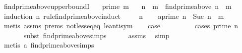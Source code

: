 \begin{isabellebody}
\endisatagproof
{\isafoldproof}%
%
\isadelimproof
\isanewline
%
\endisadelimproof
\isanewline
{}\isamarkupfalse%
\ find{\isacharunderscore}{\kern0pt}prime{\isacharunderscore}{\kern0pt}above{\isacharunderscore}{\kern0pt}upper{\isacharunderscore}{\kern0pt}boundI{\isacharcolon}{\kern0pt}\isanewline
\ \ \ {\isachardoublequoteopen}prime\ m{\isachardoublequoteclose}\isanewline
\ \ \ {\isachardoublequoteopen}n\ {\isasymle}\ m\ {\isasymLongrightarrow}\ find{\isacharunderscore}{\kern0pt}prime{\isacharunderscore}{\kern0pt}above\ n\ {\isasymle}\ m{\isachardoublequoteclose}\isanewline
%
\isadelimproof
%
\endisadelimproof
%
\isatagproof
{}\isamarkupfalse%
\ {\isacharparenleft}{\kern0pt}induction\ n\ rule{\isacharcolon}{\kern0pt}find{\isacharunderscore}{\kern0pt}prime{\isacharunderscore}{\kern0pt}above{\isachardot}{\kern0pt}induct{\isacharparenright}{\kern0pt}\isanewline
\ \ \isamarkupfalse%
\ {\isacharparenleft}{\kern0pt}{}\ n{\isacharparenright}{\kern0pt}\isanewline
\ \ \isamarkupfalse%
\ a{\isacharcolon}{\kern0pt}{\isachardoublequoteopen}{\isasymnot}prime\ n\ {\isasymLongrightarrow}\ Suc\ n\ {\isasymle}\ m{\isachardoublequoteclose}\isanewline
\ \ \ \ \isamarkupfalse%
\ {\isacharparenleft}{\kern0pt}metis\ assms\ {\isachardoublequoteopen}{}{\isachardot}{\kern0pt}prems{\isachardoublequoteclose}\ not{\isacharunderscore}{\kern0pt}less{\isacharunderscore}{\kern0pt}eq{\isacharunderscore}{\kern0pt}eq\ le{\isacharunderscore}{\kern0pt}antisym{\isacharparenright}{\kern0pt}\isanewline
\ \ \isamarkupfalse%
\ {\isacharquery}{\kern0pt}case\ \isamarkupfalse%
\ {}\ \isanewline
\ \ \ \ \isamarkupfalse%
\ {\isacharparenleft}{\kern0pt}cases\ {\isachardoublequoteopen}prime\ n{\isachardoublequoteclose}{\isacharparenright}{\kern0pt}\isanewline
\ \ \ \ \ \isamarkupfalse%
\ {\isacharparenleft}{\kern0pt}subst\ find{\isacharunderscore}{\kern0pt}prime{\isacharunderscore}{\kern0pt}above{\isachardot}{\kern0pt}simps{\isacharparenright}{\kern0pt}\isanewline
\ \ \ \ \isamarkupfalse%
\ assms{\isacharparenleft}{\kern0pt}{}{\isacharparenright}{\kern0pt}\ \isamarkupfalse%
\ simp\isanewline
\ \ \ \ \isamarkupfalse%
\ {\isacharparenleft}{\kern0pt}metis\ a\ find{\isacharunderscore}{\kern0pt}prime{\isacharunderscore}{\kern0pt}above{\isachardot}{\kern0pt}simps{\isacharparenright}{\kern0pt}\isanewline
{}\isamarkupfalse%

\end{isabellebody}
